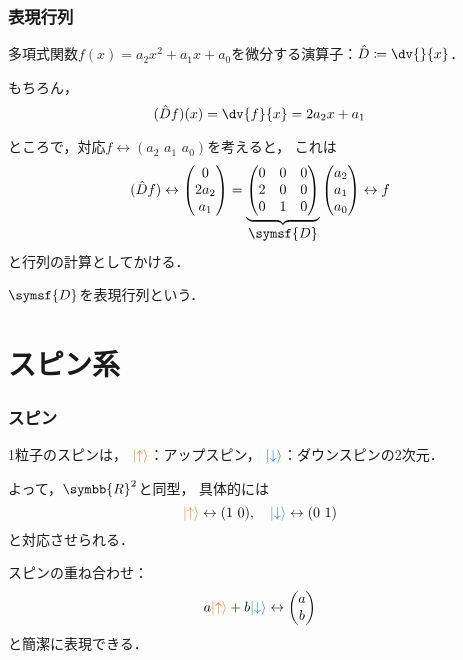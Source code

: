 \documentclass[
    10pt,
    ]{sotsu-beamer}
\newcommand{\upspin}{\mathcolor{red}{\ket{\uparrow}}}
\newcommand{\dwspin}{\mathcolor{blue}{\ket{\downarrow}}}
\begin{document}
\begin{frame}
    \frametitle{表現行列}

    多項式関数$f(x) = a_2 x^2 + a_1 x + a_0$を微分する演算子：$\hat{D} \coloneq \dv{}{x}$．

    もちろん，
    \begin{equation*}
        (\hat{D} f) (x) = \dv{f}{x} = 2 a_2 x + a_1
    \end{equation*}

    \pause

    ところで，対応$f \leftrightarrow (a_2 \,\, a_1 \,\, a_0)$を考えると，
    これは
    \begin{equation*}
        (\hat{D} f)
        \leftrightarrow
        \begin{pmatrix}
            0  \\  2 a_2  \\  a_1
        \end{pmatrix}
        =
        \underbrace{
        \begin{pmatrix}
            0  &  0  &  0  \\
            2  &  0  &  0  \\
            0  &  1  &  0
        \end{pmatrix}
        }_{\text{\normalsize$\symsf{D}$}}
        \begin{pmatrix}
            a_2  \\  a_1  \\  a_0
        \end{pmatrix}
        \leftrightarrow
        f
    \end{equation*}
    と行列の計算としてかける．

    \pause

    $\symsf{D}$を\alert{表現行列}という．

\end{frame}



\section{スピン系}

\begin{frame}
    \frametitle{スピン}

    1粒子のスピンは，
    $\upspin$：アップスピン，
    $\dwspin$：ダウンスピンの2次元．

    \pause

    よって，$\symbb{R}^2$と同型，
    具体的には
    \begin{equation*}
        \upspin \leftrightarrow (1 \,\, 0),
        \quad 
        \dwspin \leftrightarrow (0 \,\, 1)
    \end{equation*}
    と対応させられる．

    \pause

    スピンの重ね合わせ：
    \[  a \upspin + b \dwspin \leftrightarrow 
    \begin{pmatrix}
        a  \\  b
    \end{pmatrix}  \]
    と簡潔に表現できる．

\end{frame}
\end{document}
